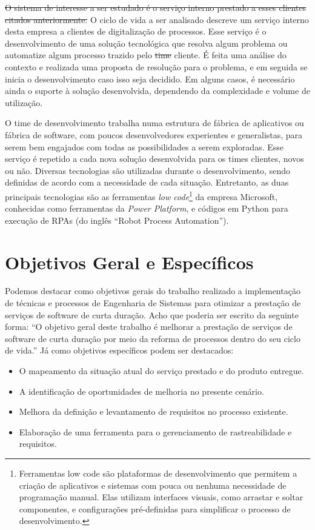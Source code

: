	\sout{O sistema de interesse a ser estudado é o serviço interno prestado a esses clientes 
	citados anteriormente.} {\color{red} O ciclo de vida a ser analisado descreve um serviço interno desta empresa a clientes de digitalização de processos.} Esse serviço é o desenvolvimento de uma solução 
	tecnológica que resolva algum problema ou automatize algum processo trazido pelo 
	\sout{time} cliente. É feita uma análise do contexto e realizada uma proposta de resolução 
	para o problema, e em seguida se inicia o desenvolvimento caso isso seja decidido. 
	Em alguns casos, é necessário ainda o suporte à solução desenvolvida, dependendo 
	da complexidade e volume de utilização. 

	O time {\color{red} de desenvolvimento} trabalha numa estrutura de fábrica de aplicativos ou fábrica de software, 
	com poucos desenvolvedores experientes e generalistas, para serem bem 
	engajados com todas as possibilidades a serem exploradas. Esse serviço é repetido 
	a cada nova solução desenvolvida para os times clientes, novos ou não. 
	Diversas tecnologias são utilizadas durante o desenvolvimento, sendo definidas de 
	acordo com a necessidade de cada situação. Entretanto, as duas principais 
	tecnologias são as ferramentas \textit{low code}\footnote{Ferramentas low code são plataformas de desenvolvimento que permitem a criação de aplicativos e sistemas com pouca ou nenhuma necessidade de programação manual. Elas utilizam interfaces visuais, como arrastar e soltar componentes, e configurações pré-definidas para simplificar o processo de desenvolvimento.} da empresa Microsoft, conhecidas como 
	ferramentas da \textit{Power Platform}, e códigos em Python para execução de RPAs (do 
	inglês ``Robot Process Automation''). 

	\section{Objetivos Geral e Específicos}\label{sec:introducao:objetivos}

		Podemos destacar como objetivos gerais do trabalho realizado a implementação de 
		técnicas e processos de Engenharia de Sistemas para otimizar a prestação de 
		serviços de software de curta duração. {\color{red} Acho que poderia ser escrito da seguinte forma: ``O objetivo geral deste trabalho é melhorar a prestação de serviços de software de curta duração por meio da reforma de processos dentro do seu ciclo de vida.''}
		Já como objetivos específicos podem ser destacados: 
		\begin{itemize}
			\item O mapeamento da situação atual do serviço prestado e do produto entregue.
			\item A identificação de oportunidades de melhoria no presente cenário. 
			\item Melhora da definição e levantamento de requisitos no processo existente.
			\item Elaboração de uma ferramenta para o gerenciamento de rastreabilidade e requisitos.
		\end{itemize}
 		
